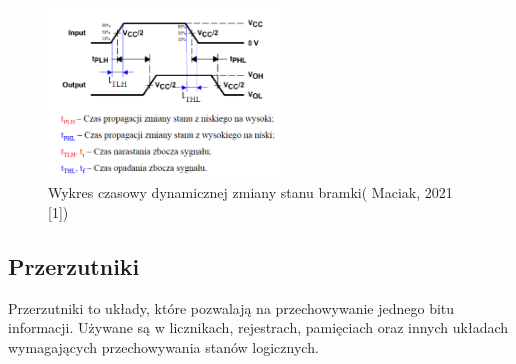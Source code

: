 \documentclass{article}
\begin{document}
    \begin{figure}[h]
    	\centering
    	\includegraphics[width=0.55\textwidth]{czas.PNG}
    	\caption{Wykres czasowy dynamicznej zmiany stanu bramki( Maciak, 2021 [1])}
    	\label{fig:moj_obrazek}
    \end{figure}
	\pagebreak


\subsection{ Przerzutniki}

    Przerzutniki to układy, które pozwalają na przechowywanie jednego bitu informacji. Używane są w licznikach, rejestrach, pamięciach oraz innych układach wymagających przechowywania stanów logicznych.

\end{document}
